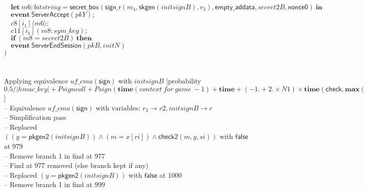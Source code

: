 \documentclass{article}
\newcommand{\cinput}[2]{{#1}({#2})}
\newcommand{\coutput}[2]{\overline{#1}\langle{#2}\rangle}
\newcommand{\kw}[1]{\mathbf{#1}}
\newcommand{\kwf}[1]{\mathsf{#1}}
\newcommand{\var}[1]{\mathit{#1}}
\newcommand{\kwt}[1]{\mathit{#1}}
\newcommand{\kwp}[1]{\mathit{#1}}
\newcommand{\kwc}[1]{\mathit{#1}}
\begin{document}
\begin{tabbing}
\>$\quad \kw{let}\ \var{m6}: \kwt{bitstring} = \kwf{secret{\_}box}(\kwf{sign{\_}r}(\var{m}_{4}, \kwf{skgen}(\var{initsignB}), \var{r}_{3}), \kwf{empty{\_}addata}, \var{secret2B}, \kwf{nonce0})\ \kw{in}$\\
\>$\quad \kw{event}\ \kwf{ServerAccept}(\var{pkY});$\\
\>$\quad \coutput{\kwc{c8}[\var{i}_{1}]}{\var{m6}};$\\
\>$\quad \cinput{\kwc{c11}[\var{i}_{1}]}{\var{m8}: \kwt{sym{\_}key}};$\\
\>$\quad \kw{if}\ (\var{m8}  =  \var{secret2B})\ \kw{then}$\\
\>$\quad \kw{event}\ \kwf{ServerEndSession}(\var{pkB}, \var{initN})$\\
\>$)$\\
\\
\\
Applying equivalence $\kwc{uf{\_}cma}(\kwf{sign})$ with $\var{initsignB}$ {}[probability $0.5 / |\kwt{hmac{\_}key}| + \var{Psigncoll} + \var{Psign}(\kw{time}(\mathit{context\ for\ game}\ -1) + \kw{time} + (-1. + 2. \times \kwp{N1}) \times \kw{time}(\kwf{check}, \kw{max}(\kw{length}((\kwt{hmac{\_}key}, \kwt{G}, \kwt{bitstring}), \allowbreak \kw{length}(\kwf{hash}, \allowbreak \kw{length}(\kwf{G2bit}))), \allowbreak \kw{length}((\kwt{hmac{\_}key}, \kwt{bitstring}, \kwt{G}, \kwt{bitstring}), \allowbreak \kw{maxlength}(\var{sign{\_}A}), \allowbreak \kw{length}(\kwf{hash}, \allowbreak \kw{length}(\kwf{G2bit})))), \allowbreak \kw{max}(\kw{maxlength}(\var{sign{\_}Y}), \allowbreak \kw{maxlength}(\var{sign{\_}B}))), \allowbreak \kwp{N1}, \allowbreak \kw{maxlength}(\var{m}_{4}))${}]{}\\
\quad -- Equivalence $\kwc{uf{\_}cma}(\kwf{sign})$ with $\textrm{variables: }\var{r}_{3} \rightarrow \var{r2}, \var{initsignB} \rightarrow \var{r}$\\
\quad -- Simplification pass\\
\qquad -- Replaced $((\var{y}  =  \kwf{pkgen2}(\var{initsignB})) \wedge  (\var{m}  =  \var{x}[\var{ri}]) \wedge  \kwf{check2}(\var{m}, \var{y}, \var{si}))$ with $\kwf{false}$ at 979\\
\qquad -- Remove branch 1 in find at 977\\
\qquad -- Find at 977 removed (else branch kept if any)\\
\qquad -- Replaced $(\var{y}  =  \kwf{pkgen2}(\var{initsignB}))$ with $\kwf{false}$ at 1000\\
\qquad -- Remove branch 1 in find at 999\\

\end{tabbing}
\end{document}
